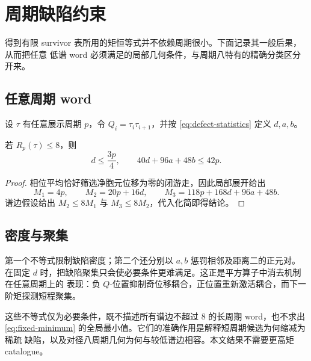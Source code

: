 \section{周期缺陷约束}
\label{sec:defect-obstruction}

得到有限 survivor 表所用的矩恒等式并不依赖周期很小。下面记录其一般后果，从而把任意
低谱 word 必须满足的局部几何条件，与周期八特有的精确分类区分开来。

\subsection{任意周期 word}

设 $\tau$ 有任意展示周期 $p$，令 $Q_i=\tau_i\tau_{i+1}$，并按
\eqref{eq:defect-statistics} 定义 $d,a,b$。

\begin{theorem}[矩约束]
\label{thm:moment-obstruction}
若 $R_p(\tau)\leq8$，则
\begin{equation}
 d\leq\frac{3p}{4},\qquad 40d+96a+48b\leq42p.
 \label{eq:general-defect-bounds}
\end{equation}
\end{theorem}

\begin{proof}
相位平均恰好筛选净胞元位移为零的闭游走，因此局部展开给出
\[
M_1=4p,\qquad M_2=20p+16d,\qquad
M_3=118p+168d+96a+48b.
\]
谱边假设给出 $M_2\leq8M_1$ 与 $M_3\leq8M_2$，代入化简即得结论。
\end{proof}

\subsection{密度与聚集}

第一个不等式限制缺陷密度；第二个还分别以 $a,b$ 惩罚相邻及距离二的正元对。在固定
$d$ 时，把缺陷聚集只会使必要条件更难满足。这正是平方算子中消去机制在任意周期上的
表现：负 $Q$-位置抑制奇位移耦合，正位置重新激活耦合，而下一阶矩探测短程聚集。

这些不等式仅为必要条件，既不描述所有谱边不超过 $8$ 的长周期 word，也不求出
\eqref{eq:fixed-minimum} 的全局最小值。它们的准确作用是解释短周期候选为何缩减为稀疏
缺陷，以及对径八周期几何为何与较低谱边相容。本文结果不需要更高矩 catalogue。
